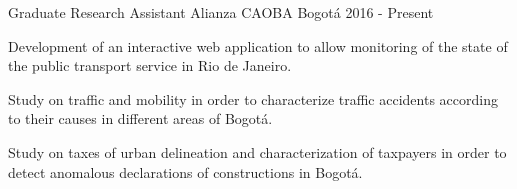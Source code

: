 


\begin{cventries}


\cventry
{Graduate Research Assistant} %
{Alianza CAOBA} %
{Bogotá} %
{2016 - Present} %
{
    \begin{cvitems}
    \item{Development of an interactive web application to allow monitoring of the state of the public transport service in Rio de Janeiro.}
    \item{Study on traffic and mobility in order to characterize traffic accidents according to their causes in different areas of Bogotá.}
    \item{Study on taxes of urban delineation and characterization of taxpayers in order to detect anomalous declarations of constructions in Bogotá.}
    \end{cvitems}
} %

\vspace{-0.5cm}
\end{cventries}
